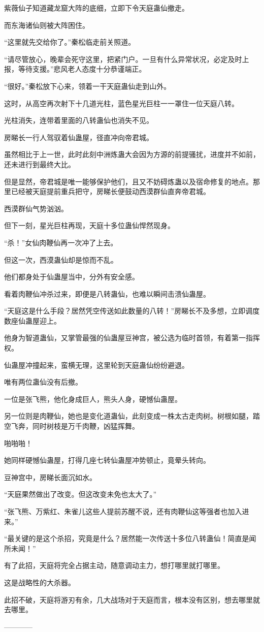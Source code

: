 \begin{this_body}
紫薇仙子知道藏龙窟大阵的底细，立即下令天庭蛊仙撤走。

而东海诸仙则被大阵困住。

“这里就先交给你了。”秦松临走前关照道。

“请尽管放心，晚辈会死守这里，把紧门户。一旦有什么异常状况，必定及时上报，等待支援。”悲风老人态度十分恭谨端正。

“很好。”秦松放下心来，领着一干天庭蛊仙走到山外。

这时，从高空再次射下十几道光柱，蓝色星光巨柱一一罩住一位天庭八转。

光柱消失，连带着里面的八转蛊仙也消失不见。

房睇长一行人驾驭着仙蛊屋，径直冲向帝君城。

虽然相比于上一世，此时此刻中洲炼蛊大会因为方源的前提骚扰，进度并不如前，还未进行到最终大比。

但是显然，帝君城是唯一能够保护他们，且又不妨碍炼蛊以及宿命修复的地点。那里已经被天庭提前重兵把守，房睇长便鼓动西漠群仙直奔帝君城。

西漠群仙气势汹汹。

但下一刻，星光巨柱再现，天庭十多位蛊仙悍然现身。

“杀！”女仙肉鞭仙再一次冲了上去。

但这一次，西漠蛊仙却是惊而不乱。

他们都身处于仙蛊屋当中，分外有安全感。

看着肉鞭仙冲杀过来，即便是八转蛊仙，也难以瞬间击溃仙蛊屋。

“天庭这是什么手段？居然凭空传送如此数量的八转！”房睇长不及多想，立即调度数座仙蛊屋迎上。

他身为智道蛊仙，又掌管最强的仙蛊屋豆神宫，被公选为临时首领，有着第一指挥权。

仙蛊屋冲撞起来，蛮横无理，这里轮到天庭蛊仙纷纷避退。

唯有两位蛊仙没有后撤。

一位是张飞熊，他化身成巨人，熊头人身，硬憾仙蛊屋。

另一位则是肉鞭仙，她也是变化道蛊仙，此刻变成一株太古走肉树。树根如腿，踏空飞奔，同时树枝是万千肉鞭，凶猛挥舞。

啪啪啪！

她同样硬憾仙蛊屋，打得几座七转仙蛊屋冲势顿止，竟晕头转向。

豆神宫中，房睇长面沉如水。

“天庭果然做出了改变。但这改变未免也太大了。”

“张飞熊、万紫红、朱雀儿这些人提前苏醒不说，还有肉鞭仙这等强者也加入进来。”

“最关键的是这个杀招，究竟是什么？居然能一次传送十多位八转蛊仙！简直是闻所未闻！”

有了此招，天庭将完全占据主动，随意调动主力，想打哪里就打哪里。

这是战略性的大杀器。

此招不破，天庭将游刃有余，几大战场对于天庭而言，根本没有区别，想去哪里就去哪里。

------------

\end{this_body}

